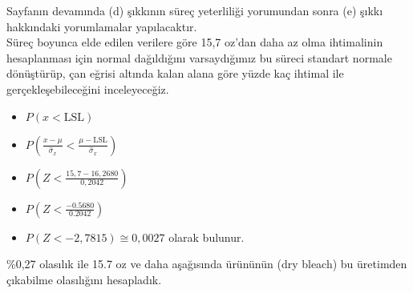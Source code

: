 Sayfanın devamında (d) şıkkının süreç yeterliliği yorumundan sonra (e) şıkkı hakkındaki yorumlamalar yapılacaktır.\\

Süreç boyunca elde edilen verilere göre 15,7 oz’dan daha az olma ihtimalinin hesaplanması için normal dağıldığını varsaydığımız bu süreci standart normale dönüştürüp, çan eğrisi altında kalan alana göre yüzde kaç ihtimal ile gerçekleşebileceğini inceleyeceğiz.

\begin{itemize}[label*={}]
	\item
	$P\left(x < \text{LSL}\right)$
	\item
	$P\left(\frac{x-\mu}{\hat\sigma_x} < \frac{\mu - \text{LSL}}{\hat\sigma_x}\right)$
	\item
	$P\left(Z < \frac{15,7-16,2680}{0,2042}\right)$
	\item
	$P\left(Z < \frac{-0.5680}{0.2042}\right)$
	\item
	$P\left(Z < -2,7815\right) \cong 0,0027$ olarak bulunur.
\end{itemize}

\%0,27 olasılık ile 15.7 oz ve daha aşağısında ürününün (dry bleach) bu üretimden çıkabilme olasılığını hesapladık.\\

